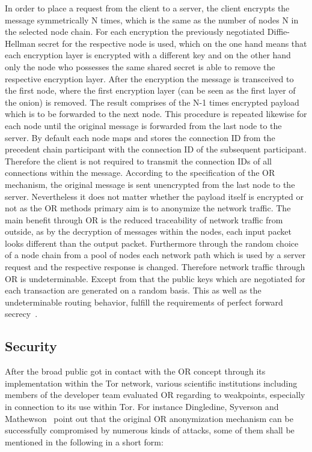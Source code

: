 \documentclass{sig-alternate}
\begin{document}
In order to place a request from the client to a server, the client encrypts the message symmetrically N times, which is the same as the number of nodes N in the selected node chain. For each encryption the previously negotiated Diffie-Hellman secret for the respective node is used, which on the one hand means that each encryption layer is encrypted with a different key and on the other hand only the node who possesses the same shared secret is able to remove the respective encryption layer. 
After the encryption the message is transceived to the first node, where the first encryption layer (can be seen as the first layer of the onion) is removed. The result comprises of the N-1 times encrypted payload which is to be forwarded to the next node. This procedure is repeated likewise for each node until the original message is forwarded from the last node to the server. By default each node maps and stores the connection ID from the precedent chain participant with the connection ID of the subsequent participant. Therefore the client is not required to transmit the connection IDs of all connections within the message. According to the specification of the OR mechanism, the original message is sent unencrypted from the last node to the server. Nevertheless it does not matter whether the payload itself is encrypted or not as the OR methods primary aim is to anonymize the network traffic.  
The main benefit through OR is the reduced traceability of network traffic from outside, as by the decryption of messages within the nodes, each input packet looks different than the output packet. Furthermore through the random choice of a node chain from a pool of nodes each network path which is used by a server request and the respective response is changed. Therefore network traffic through OR is undeterminable. Except from that the public keys which are negotiated for each transaction are generated on a random basis. This as well as the undeterminable routing behavior, fulfill the requirements of perfect forward secrecy~\cite{diffie1992authentication}.  

\subsection{Security}

After the broad public got in contact with the OR concept through its implementation within the Tor network, various scientific institutions including members of the developer team evaluated OR regarding to weakpoints, especially in connection to its use within Tor. For instance Dingledine, Syverson and Mathewson~\cite{dingledine2004tor} point out that the original OR anonymization mechanism can be successfully compromised by numerous kinds of attacks, some of them shall be mentioned in the following in a short form:
\end{document}
